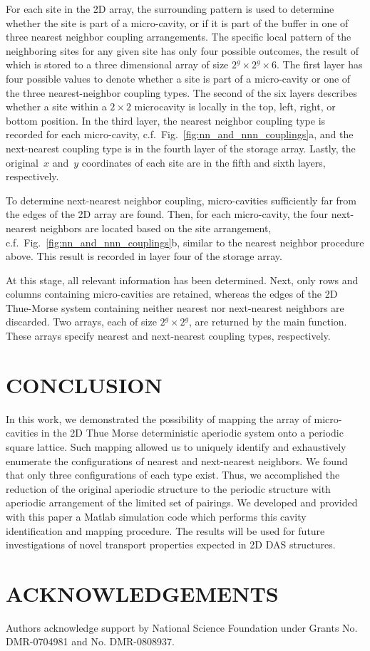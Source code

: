 For each site in the 2D array, the surrounding pattern is used to determine whether the site is part of a micro-cavity, or if it is part of the buffer in one of three nearest neighbor coupling arrangements. The specific local pattern of the neighboring sites for any given site has only four possible outcomes, the result of which is stored to a three dimensional array of size $2^g\times2^g\times6$. The first layer has four possible values to denote whether a site is part of a micro-cavity or one of the three nearest-neighbor coupling types. The second of the six layers describes whether a site within a $2\times 2$ microcavity is locally in the top, left, right, or bottom position. In the third layer, the nearest neighbor coupling type is recorded for each micro-cavity, c.f.~Fig.~\ref{fig:nn_and_nnn_couplings}a, and the next-nearest coupling type is in the fourth layer of the storage array. Lastly, the original~$x$ and~$y$ coordinates of each site are in the fifth and sixth layers, respectively. 

To determine next-nearest neighbor coupling, micro-cavities sufficiently far from the edges of the 2D array are found. Then, for each micro-cavity, the four next-nearest neighbors are located based on the site arrangement, c.f.~Fig.~\ref{fig:nn_and_nnn_couplings}b, similar to the nearest neighbor procedure above. This result is recorded in layer four of the storage array.

At this stage, all relevant information has been determined. Next, only rows and columns containing micro-cavities are retained, whereas the edges of the 2D Thue-Morse system containing neither nearest nor next-nearest neighbors are discarded. Two arrays, each of size $2^g\times 2^g$, are returned by the main function. These arrays specify nearest and next-nearest coupling types, respectively. 

\section{CONCLUSION}

In this work, we demonstrated the possibility of mapping the array of micro-cavities in the 2D Thue Morse deterministic aperiodic system onto a periodic square lattice. Such mapping allowed us to uniquely identify and exhaustively enumerate the configurations of nearest and next-nearest neighbors. We found that only three configurations of each type exist. Thus, we accomplished the reduction of the original aperiodic structure to the periodic structure with aperiodic arrangement of the limited set of pairings. We developed and provided with this paper a Matlab simulation code which performs this cavity identification and mapping procedure. The results will be used for future investigations of novel transport properties expected in 2D DAS structures. 

\section{ACKNOWLEDGEMENTS}

Authors acknowledge support by National Science Foundation under Grants No. DMR-0704981 and No. DMR-0808937.
% 
% 
% 
% 
% 


 